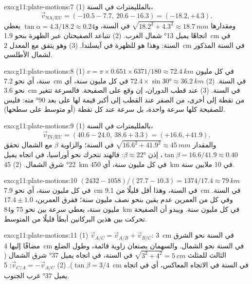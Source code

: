 \begin{solution}{exo:g11:plate-motions:7}
(1) بالملليمترات في السنة،
\[
  \vec v_{\mathrm{NA/EU}} = (-10.5 - 7.7,\ 20.6 - 16.3) = (-18.2, +4.3).
\] ومقدارها $\sqrt{18.2^2 + 4.3^2} \approx
\qty{18.7}{mm}$ في السنة، و$\tan\alpha = 4.3/18.2 \approx 0.24$ يعطي
اتجاهًا يميل \ang{13} شمال الغرب. (2) تتباعد الصفيحتان عبر الظهرة بنحو
\qty{1.9}{cm} في السنة: وهذا هو  للظهرة في
آيسلندا. (3) وهو يتفق مع المعدل \qty{2}{cm} في السنة المذكور لشمال
الأطلسي.
\end{solution}

\begin{solution}{exo:g11:plate-motions:8}
(1) $v = \pi \times 0.651 \times 6371/180 \approx \qty{72.4}{km}$ في كل مليون
سنة، أي نحو \qty{7.2}{cm} في السنة. (2) $72.4 \times \sin\ang{30} \approx
\qty{36.2}{km}$ في كل مليون سنة، أي نحو \qty{3.6}{cm} في السنة. (3) عند قطب
الدوران، إن وقع على الصفيحة. فالسرعة تتغير من نقطة إلى
أخرى، من الصفر عند القطب إلى أكبر قيمة لها على بعد \ang{90} منه: فليس
للصفيحة كلها سرعة واحدة، بل سرعة عند كل نقطة (أو متوسط
على سطحها).
\end{solution}

\begin{solution}{exo:g11:plate-motions:9}
(1) بالملليمترات في السنة،
\[
  \vec v_{\mathrm{IN/EU}} = (40.6 - 24.0,\ 38.6 + 3.3) = (+16.6, +41.9).
\] والمقدار $\sqrt{16.6^2 + 41.9^2} \approx
\qty{45}{mm}$ في السنة؛ والزاوية $\beta$ مع الشمال تحقق $\tan\beta =
16.6/41.9 \approx 0.40$، إذن $\beta \approx \ang{22}$: فالهند تتحرك نحو
أوراسيا، في اتجاه يميل \ang{22} شرق الشمال. (2) \qty{45}{km} في كل مليون سنة، أي
\qty{450}{km} في 10 ملايين سنة.
\end{solution}

\begin{solution}{exo:g11:plate-motions:10}
$(2432 - 1058)/(27.7 - 10.3) = 1374/17.4 \approx \qty{79}{km}$ في كل مليون
سنة، أي نحو \qty{7.9}{cm} في السنة، وهذا أقل قليلًا من \qty{9.1}{cm} في السنة.
وفي كل من العمرين عدم يقين بنحو نصف مليون سنة؛ ففرق
العمرين، $17.4 \pm 1.0$ مليون سنة، يعطي سرعة بين نحو 75
و\qty{84}{km} في كل مليون سنة. ويبدو أن الصفيحة تحركت بين هذين البركانين
أبطأ قليلًا من المتوسط.
\end{solution}

\begin{solution}{exo:g11:plate-motions:11}
(1) $\vec v_{A/C} = \vec v_{A/B} + \vec v_{B/C}$: \qty{3}{cm} في السنة نحو الشرق مضافًا إليها
\qty{4}{cm} في السنة نحو الشمال. والسهمان يصنعان زاوية قائمة، وطول الضلع
الثالث للمثلث $\sqrt{3^2 + 4^2} = \qty{5}{cm}$ في السنة،
في اتجاه يميل \ang{37} شرق الشمال ($\tan\beta = 3/4$). (2) $\vec v_{C/A}
= -\vec v_{A/C}$: \qty{5}{cm} في السنة في الاتجاه المعاكس، أي في اتجاه يميل \ang{37} غرب
الجنوب.
\end{solution}

